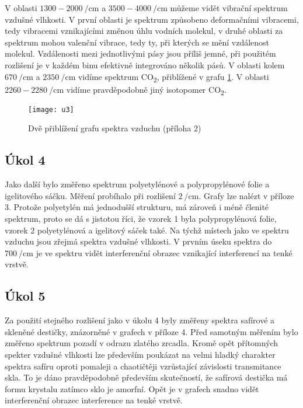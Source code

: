 \documentclass{protokol}
\begin{document}
      V oblasti $1300 - \SI{2000}{\per\centi\metre}$ a $3500 - \SI{4000}{\per\centi\metre}$ můžeme vidět vibrační spektrum vzdušné vlhkosti. V první oblasti je spektrum způsobeno deformačními vibracemi, tedy vibracemi vznikajícími změnou úhlu vodních molekul, v druhé oblasti za spektrum mohou valenční vibrace, tedy ty, při kterých se mění vzdálenost molekul. Vzdálenosti mezi jednotlivými pásy jsou příliš jemné, při použitém rozlišení je v každém binu efektivně integrováno několik pásů. V oblasti kolem $\SI{670}{\per\centi\metre}$ a $\SI{2350}{\per\centi\metre}$ vidíme spektrum CO\textsubscript{2}, přiblížené v grafu \ref{fig:u3}. V oblasti $2260 - \SI{2280}{\per\centi\metre}$ vidíme pravděpodobně jiný isotopomer CO\textsubscript{2}.

      \begin{figure}[H]
        \centering
        \texttt{[image: u3]}
        \caption{Dvě přiblížení grafu spektra vzduchu (příloha 2)}
        \label{fig:u3}
      \end{figure}

    \subsection*{Úkol 4}
      
      Jako další bylo změřeno spektrum polyetylénové a polypropylénové folie a igelitového sáčku. Měření probíhalo při rozlišení $\SI{2}{\per\centi\metre}$. Grafy lze nalézt v příloze 3. Protože polyetylén má jednodušší strukturu, má zároveň i méně členité spektrum, proto se dá s jistotou říci, že vzorek 1 byla polypropylénová folie, vzorek 2 polyetylénová a igelitový sáček také. Na týchž místech jako ve spektru vzduchu jsou zřejmá spektra vzdušné vlhkosti. V prvním úseku spektra do $\SI{700}{\per\centi\metre}$ je ve spektru vidět interferenční obrazec vznikající interferencí na tenké vrstvě.

    \subsection*{Úkol 5}

      Za použití stejného rozlišení jako v úkolu 4 byly změřeny spektra safírové a skleněné destičky, znázorněné v grafech v příloze 4. Před samotným měřením bylo změřeno spektrum pozadí v odrazu zlatého zrcadla. Kromě opět přítomných spekter vzdušné vlhkosti lze především poukázat na velmi hladký charakter spektra safíru oproti pomaleji a chaotičtěji vzrůstající závislosti transmitance skla. To je dáno pravděpodobně především skutečností, že safírová destička má formu krystalu zatímco sklo je amorfní. Opět je v grafech snadno vidět interferenční obrazec interference na tenké vrstvě.
\end{document}
